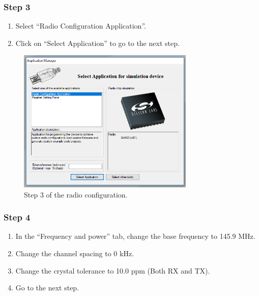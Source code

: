 \subsubsection{Step 3}

\begin{enumerate}
    \item Select ``Radio Configuration Application''.
    \item Click on ``Select Application'' to go to the next step.
\end{enumerate}

\begin{figure}[!h]
	\begin{center}
		\includegraphics[width=0.75\textwidth]{figures/wds-tutorial/wds-tutorial-3.png}
		\caption{Step 3 of the radio configuration.}
		\label{fig:wds-tutorial-step-3}
	\end{center}
\end{figure}

\subsubsection{Step 4}

\begin{enumerate}
    \item In the ``Frequency and power'' tab, change the base frequency to 145.9 MHz.
    \item Change the channel spacing to 0 kHz.
    \item Change the crystal tolerance to 10.0 ppm (Both RX and TX).
    \item Go to the next step.
\end{enumerate}

